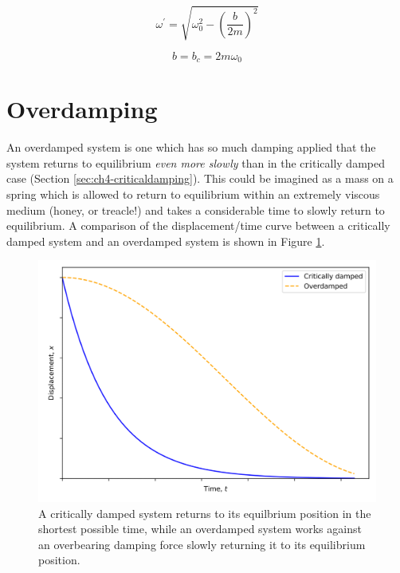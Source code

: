 \documentclass[
]{book}
\begin{document}
\begin{equation}
\omega^\prime = \sqrt{\omega_0^2 - \left(\frac{b}{2m}\right)^2}
\label{eq:ch4-dampfrequency1}
\end{equation}

\begin{equation}
b = b_c = 2m\omega_0
\label{eq:ch4-criticaldamp1}
\end{equation}

\hypertarget{sec:ch4-overdamping}{%
\section{Overdamping}\label{sec:ch4-overdamping}}

An overdamped system is one which has so much damping applied that the system returns to equilibrium \emph{even more slowly} than in the critically damped case (Section \ref{sec:ch4-criticaldamping}). This could be imagined as a mass on a spring which is allowed to return to equilibrium within an extremely viscous medium (honey, or treacle!) and takes a considerable time to slowly return to equilibrium. A comparison of the displacement/time curve between a critically damped system and an overdamped system is shown in Figure \ref{fig:ch4-critvsoverdamped1}.

\begin{figure}

{\centering \includegraphics[width=0.7\linewidth]{visualisations/ch4-critoverdamp1} 

}

\caption{A critically damped system returns to its equilbrium position in the shortest possible time, while an overdamped system works against an overbearing damping force slowly returning it to its equilibrium position.}\label{fig:ch4-critvsoverdamped1}
\end{figure}
\end{document}
